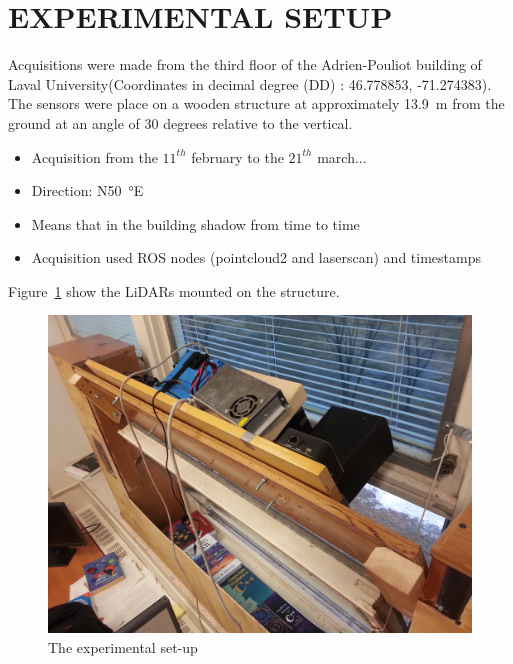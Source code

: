 \section{EXPERIMENTAL SETUP}

Acquisitions were made from the third floor of the Adrien-Pouliot building of Laval University(Coordinates in decimal degree (DD) : 46.778853, -71.274383). The sensors were place on a wooden structure at approximately \SI{13.9}{\meter} from the ground at an angle of 30 degrees relative to the vertical.
\begin{itemize}
    \item Acquisition from the $11^{th}$ february to the $21^{th}$ march...
    \item Direction: N\SI{50}{\degree}E
    \item Means that in the building shadow from time to time
    \item Acquisition used ROS nodes (pointcloud2 and laserscan) and timestamps
\end{itemize}

Figure~\ref{fig:setup} show the LiDARs mounted on the structure.

\begin{figure}[h]
    \centering
    \includegraphics[width=0.9\linewidth]{./img/setup_diag.jpg}
    \caption{The experimental set-up}
    \label{fig:setup}
\end{figure}

